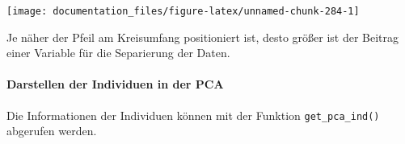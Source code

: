 \documentclass[
]{article}
\begin{document}
\begin{center}\texttt{[image: documentation\_files/figure-latex/unnamed-chunk-284-1]} \end{center}

Je näher der Pfeil am Kreisumfang positioniert ist, desto größer ist der Beitrag einer Variable für die Separierung der Daten.

\hypertarget{darstellen-der-individuen-in-der-pca}{%
\paragraph{Darstellen der Individuen in der PCA}\label{darstellen-der-individuen-in-der-pca}}

Die Informationen der Individuen können mit der Funktion \texttt{get\_pca\_ind()} abgerufen werden.
\end{document}
